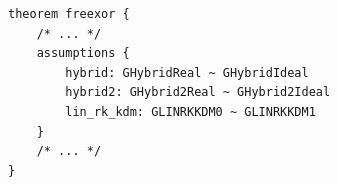 \begin{longlisting}
\begin{verbatim}
theorem freexor {
    /* ... */
    assumptions {
        hybrid: GHybridReal ~ GHybridIdeal
        hybrid2: GHybrid2Real ~ GHybrid2Ideal
        lin_rk_kdm: GLINRKKDM0 ~ GLINRKKDM1
    }
    /* ... */
}
\end{verbatim}
\caption{Assumptions used in theorem }
\label{lst:domino-freexor-assumption}
\end{longlisting}
